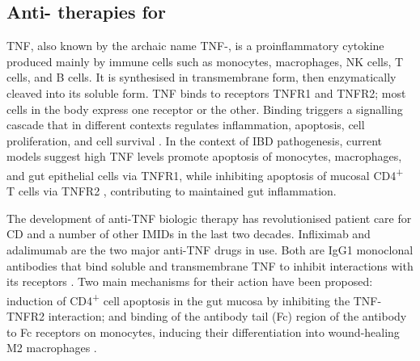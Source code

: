 \subsection{Anti- therapies for }

\Gls{TNF}, also known by the archaic name \gls{TNF}\nobreakdash-\textalpha, is a proinflammatory cytokine produced mainly by immune cells such as monocytes, macrophages, \gls{NK} cells, T cells, and B cells.
It is synthesised in transmembrane form, then enzymatically cleaved into its soluble form.
\gls{TNF} binds to receptors TNFR1 and TNFR2; most cells in the body express one receptor or the other.
Binding triggers a signalling cascade that in different contexts regulates inflammation, apoptosis, cell proliferation, and cell survival \autocite{aggarwal2003SignallingPathwaysTNF,kalliolias2016TNFBiologyPathogenic,digby-bell2019InterrogatingHostImmunity}.
In the context of \gls{IBD} pathogenesis, 
current models suggest high \gls{TNF} levels promote apoptosis of monocytes, macrophages, and gut epithelial cells via TNFR1, while inhibiting apoptosis of mucosal CD4\textsuperscript{+} T cells via TNFR2 \autocite{levin2016MechanismActionAntiTNF,adegbola2018AntiTNFTherapyCrohn,digby-bell2019InterrogatingHostImmunity},
contributing to maintained gut inflammation.

The development of anti-\gls{TNF} biologic therapy has revolutionised patient care for \gls{CD} and a number of other \glspl{IMID} in the last two decades.
Infliximab and adalimumab are the two major anti-\gls{TNF} drugs in use.
Both are IgG1 monoclonal antibodies that bind soluble and transmembrane \gls{TNF} to inhibit interactions with its receptors \autocite{lichtenstein2013ComprehensiveReviewAntitumor,adegbola2018AntiTNFTherapyCrohn}.
Two main mechanisms for their action have been proposed: induction of CD4\textsuperscript{+} cell apoptosis in the gut mucosa by inhibiting the \gls{TNF}-TNFR2 interaction; and binding of the antibody tail (Fc) region of the antibody to Fc receptors on monocytes, inducing their differentiation into wound-healing M2 macrophages \autocite{levin2016MechanismActionAntiTNF}.


